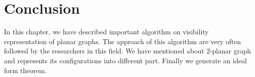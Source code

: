 \section{Conclusion}
In this chapter, we have described important algorithm on visibility representation of planar graphs. The approach of this algorithm are very often followed by the researchers in this field. We have mentioned
about 2-planar graph and represents its configurations into different part. Finally we generate an ideal form theorem.




\endinput
